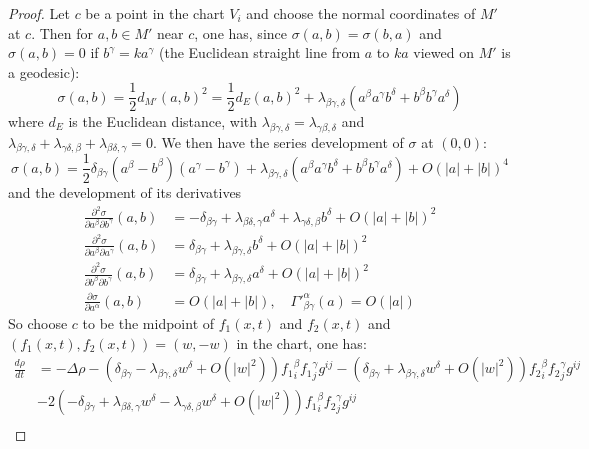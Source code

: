 \begin{proof}
Let \(c\) be a point in the chart \(V_i\) and choose the normal coordinates of \(M'\) at \(c\). Then for \(a,b\in M'\) near \(c\), one has, since \(\sigma(a,b) =
\sigma(b,a)\) and \(\sigma(a,b)=0\) if \(b^\gamma = k a^\gamma\) (the Euclidean
straight line from \(a\) to \(ka\) viewed on \(M'\) is a geodesic):
\[
 \sigma(a,b) = \frac{1}{2}d_{M'}(a,b)^2 = \frac{1}{2}d_E(a,b)^2 +
\lambda_{\beta\gamma,\delta}(a^\beta a^\gamma b^\delta + b^\beta b^\gamma a^\delta)
\]
where \(d_E\) is the Euclidean distance, with \(\lambda_{\beta\gamma,\delta} =
\lambda_{\gamma\beta,\delta}\) and \(\lambda_{\beta\gamma,\delta}
+\lambda_{\gamma\delta,\beta} + \lambda_{\beta\delta,\gamma}= 0\). We then have the
series development of \(\sigma\) at \((0,0)\):
\begin{equation}
\label{eq:dev-sig-unique}
\sigma(a,b) = \frac{1}{2}\delta_{\beta\gamma} (a^\beta - b^\beta)(a^\gamma - b^\gamma) +
\lambda_{\beta\gamma,\delta} (a^\beta a^\gamma b^\delta + b^\beta b^\gamma a^\delta) + O(|a|+|b|)^4
\end{equation}
and the development of its derivatives
\begin{align*}
  \frac{\partial^2 \sigma}{\partial a^\beta \partial b^\gamma}(a,b) &= -\delta_{\beta\gamma} + \lambda_{\beta\delta,\gamma}a^\delta + \lambda_{\gamma\delta,\beta}b^\delta + O(|a|+|b|)^2\\
  \frac{\partial^2 \sigma}{\partial a^\beta \partial a^\gamma}(a,b) &= \delta_{\beta\gamma} + \lambda_{\beta\gamma,\delta}b^\delta + O(|a|+|b|)^2\\
  \frac{\partial^2 \sigma}{\partial b^\beta \partial b^\gamma}(a,b) &= \delta_{\beta\gamma} + \lambda_{\beta\gamma,\delta}a^\delta + O(|a|+|b|)^2\\
   \frac{\partial\sigma}{\partial a^\alpha}(a,b) &= O(|a|+|b|),\quad {\Gamma'}^\alpha_{\beta\gamma}(a) = O(|a|)
\end{align*}
So choose \(c\) to be the midpoint of \(f_1(x,t)\) and \(f_2(x,t)\) and \((f_1(x,t),
f_2(x,t)) = (w,-w)\) in the chart, one has:
\begin{align}
 \frac{d\rho}{d t} &= -\Delta\rho - \left( \delta_{\beta\gamma} -\lambda_{\beta\gamma,\delta}w^\delta + O(|w|^2)  \right) {f_1}^\beta_i {f_1}^\gamma_j g^{ij}   - \left( \delta_{\beta\gamma} + \lambda_{\beta\gamma,\delta} w^\delta + O(|w|^2)\right) {f_2}^\beta_i {f_2}^\gamma_j g^{ij}\\
		   & - 2\left( -\delta_{\beta\gamma} + \lambda_{\beta\delta,\gamma}w^\delta - \lambda_{\gamma\delta,\beta} w^\delta + O(|w|^2)  \right) {f_1}^\beta_i {f_2}^\gamma_j g^{ij} \label{eq:sym-red-beta}\\

\end{align}
\end{proof}
